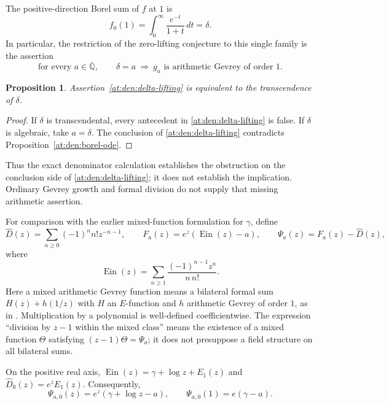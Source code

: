 \documentclass[11pt,a4paper]{article}
\newcommand{\Qbar}{\overline{\mathbb Q}}
\newcommand{\Ein}{\operatorname{Ein}}
\newtheorem{proposition}[theorem]{Proposition}
\theoremstyle{definition}
\theoremstyle{remark}
\numberwithin{equation}{section}
\begin{document}
The positive-direction Borel sum of $f$ at $1$ is
\[
 f_0(1)=\int_0^\infty\frac{e^{-t}}{1+t}\,dt=\delta.
\]
In particular, the restriction of the zero-lifting conjecture
\cite[Conjecture~2]{pm:FischlerRivoal2024} to this single family is the
assertion
\begin{equation}\label{at:den:delta-lifting}
 \text{for every }a\in\Qbar,\qquad
 \delta=a\ \Longrightarrow\
 g_a\text{ is arithmetic Gevrey of order }1.
\end{equation}

\begin{proposition}\label{at:den:delta-equivalence}
Assertion~\eqref{at:den:delta-lifting} is equivalent to the
transcendence of $\delta$.
\end{proposition}

\begin{proof}
If $\delta$ is transcendental, every antecedent in
\eqref{at:den:delta-lifting} is false.  If $\delta$ is algebraic,
take $a=\delta$.  The conclusion of
\eqref{at:den:delta-lifting} contradicts
Proposition~\ref{at:den:borel-ode}.
\end{proof}

Thus the exact denominator calculation establishes the obstruction
on the conclusion side of \eqref{at:den:delta-lifting}; it does not
establish the implication.  Ordinary Gevrey growth and formal
division do not supply that missing arithmetic assertion.

For comparison with the earlier mixed-function formulation for
$\gamma$, define
\begin{equation}\label{at:den:gamma-mixed}
 \widehat D(z)=\sum_{n\geq0}(-1)^n n!z^{-n-1},
 \qquad F_a(z)=e^z(\Ein(z)-a),
 \qquad\Psi_a(z)=F_a(z)-\widehat D(z),
\end{equation}
where
\[
 \Ein(z)=\sum_{n\geq1}\frac{(-1)^{n-1}z^n}{n\,n!}.
\]
Here a mixed arithmetic Gevrey function means a bilateral formal sum
$H(z)+h(1/z)$ with $H$ an $E$-function and $h$ arithmetic Gevrey of
order $1$, as in \cite[Definition~1]{pm:FischlerRivoal2024}.  Multiplication
by a polynomial is well-defined coefficientwise.  The expression
``division by $z-1$ within the mixed class'' means the existence of a
mixed function $\Theta$ satisfying $(z-1)\Theta=\Psi_a$; it does not
presuppose a field structure on all bilateral sums.

On the positive real axis,
$\Ein(z)=\gamma+\log z+E_1(z)$ and
$\widehat D_0(z)=e^zE_1(z)$.  Consequently,
\begin{equation}\label{at:den:gamma-sum}
 \Psi_{a,0}(z)=e^z(\gamma+\log z-a),
 \qquad\Psi_{a,0}(1)=e(\gamma-a).
\end{equation}
\end{document}
